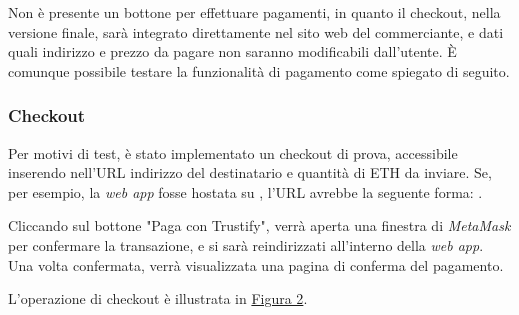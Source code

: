 Non è presente un bottone per effettuare pagamenti, in quanto il checkout, nella versione finale, sarà integrato direttamente nel sito web del commerciante, e dati quali indirizzo e prezzo da pagare non saranno modificabili dall'utente. È comunque possibile testare la funzionalità di pagamento come spiegato di seguito.
\subsubsection{Checkout}
Per motivi di test, è stato implementato un checkout di prova, accessibile inserendo nell'URL indirizzo del destinatario e quantità di ETH da inviare. Se, per esempio, la \textit{web app} fosse hostata su , l'URL avrebbe la seguente forma: .

Cliccando sul bottone "Paga con Trustify", verrà aperta una finestra di \textit{MetaMask} per confermare la transazione, e si sarà reindirizzati all'interno della \textit{web app}. Una volta confermata, verrà visualizzata una pagina di conferma del pagamento.

L'operazione di checkout è illustrata in \hyperref[fig:checkout]{Figura 2}.

